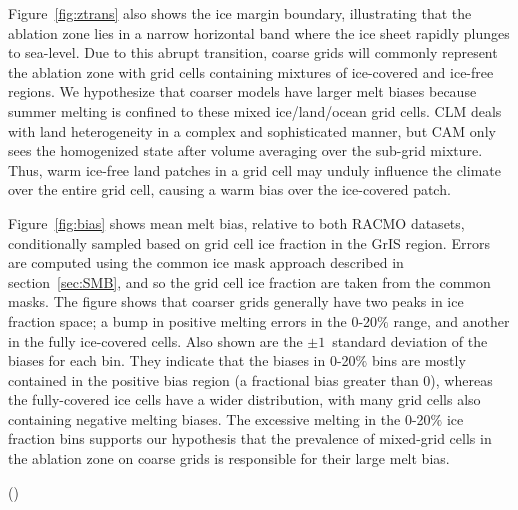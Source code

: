 \documentclass[draft]{agujournal2019}
\begin{document}
Figure~\ref{fig:ztrans} also shows the ice margin boundary, illustrating that the ablation zone lies in a narrow horizontal band where the ice sheet rapidly plunges to sea-level. Due to this abrupt transition, coarse grids will commonly represent the ablation zone with grid cells containing mixtures of ice-covered and ice-free regions. We hypothesize that coarser models have larger melt biases because summer melting is confined to these mixed ice/land/ocean grid cells. CLM deals with land heterogeneity in a complex and sophisticated manner, but CAM only sees the homogenized state after volume averaging over the sub-grid mixture. Thus, warm ice-free land patches in a grid cell may unduly influence the climate over the entire grid cell, causing a warm bias over the ice-covered patch.

Figure~\ref{fig:bias} shows mean melt bias, relative to both RACMO datasets, conditionally sampled based on grid cell ice fraction in the GrIS region. Errors are computed using the common ice mask approach described in section~\ref{sec:SMB}, and so the grid cell ice fraction are taken from the common masks. The figure shows that coarser grids generally have two peaks in ice fraction space; a bump in positive melting errors in the 0-20$\%$ range, and another in the fully ice-covered cells. Also shown are the $\pm 1$~standard deviation of the biases for each bin. They indicate that the biases in 0-20$\%$ bins are mostly contained in the positive bias region (a fractional bias greater than 0), whereas the fully-covered ice cells have a wider distribution, with many grid cells also containing negative melting biases. The excessive melting in the 0-20$\%$ ice fraction bins supports our hypothesis that the prevalence of mixed-grid cells in the ablation zone on coarse grids is responsible for their large melt bias.

({\color{blue}{Any idea why the errors are smaller in the cells with intermediate ice fraction?  I wouldn't have expected this.}})
{\color{green}{Rene - is the melt map consistent with the bin figure? Smallest errors are interior points which correspond to glacier fraction bin of 1, which the largest errors.}}
{\color{blue}{ARH - I can check. The bin figure is fractional change so its a different metric, which could explain the apparent inconsistency.}}
\end{document}
